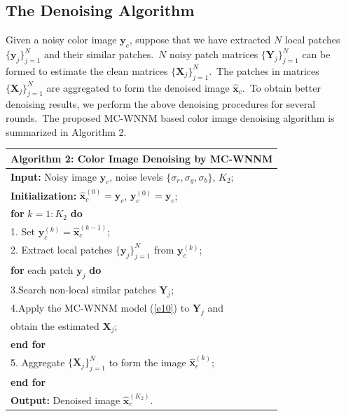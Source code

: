 \subsection{The Denoising Algorithm}

Given a noisy color image $\mathbf{y}_{c}$, suppose that we have extracted $N$ local patches $\{\mathbf{y}_{j}\}_{j=1}^{N}$ and their similar patches.\ $N$ noisy patch matrices $\{\mathbf{Y}_{j}\}_{j=1}^{N}$ can be formed to estimate the clean matrices $\{\mathbf{X}_{j}\}_{j=1}^{N}$.\ The patches in matrices $\{\mathbf{X}_{j}\}_{j=1}^{N}$ are aggregated to form the denoised  image $\hat{\mathbf{x}}_{c}$.\ To obtain better denoising results, we perform the above denoising procedures for several rounds.\ The proposed MC-WNNM based color image denoising algorithm is summarized in Algorithm 2.
\begin{table}
\begin{tabular}{l}
\hline
\textbf{Algorithm 2}: Color Image Denoising by MC-WNNM
\\
\hline
\textbf{Input:} Noisy image $\mathbf{y}_{c}$, noise levels $\{\sigma_{r}, \sigma_{g}, \sigma_{b}\}$, $K_{2}$;
\\
\textbf{Initialization:} $\hat{\mathbf{x}}_{c}^{(0)}=\mathbf{y}_{c}$, $\mathbf{y}_{c}^{(0)}=\mathbf{y}_{c}$;
\\
\textbf{for} $k = 1:K_{2}$ \textbf{do}
\\
1. Set $\mathbf{y}_{c}^{(k)}=\hat{\mathbf{x}}_{c}^{(k-1)}$;
\\
2. Extract local patches $\{\mathbf{y}_{j}\}_{j=1}^{N}$ from $\mathbf{y}_{c}^{(k)}$;
\\
\quad\textbf{for} each patch $\mathbf{y}_{j}$ \textbf{do}
\\
3.\quad Search non-local similar patches $\mathbf{Y}_{j}$;
\\
4.\quad Apply the MC-WNNM model (\ref{e10}) to $\mathbf{Y}_{j}$ and
\\
\quad \quad 
obtain the estimated $\mathbf{X}_{j}$;
\\
\quad\textbf{end for}
\\
5. Aggregate $\{\mathbf{X}_{j}\}_{j=1}^{N}$ to form the image $\hat{\mathbf{x}}_{c}^{(k)}$;
\\
\textbf{end for}
\\
\textbf{Output:} Denoised image $\hat{\mathbf{x}}_{c}^{(K_{2})}$.
\\
\hline
\end{tabular}
\label{a2}
\end{table}


